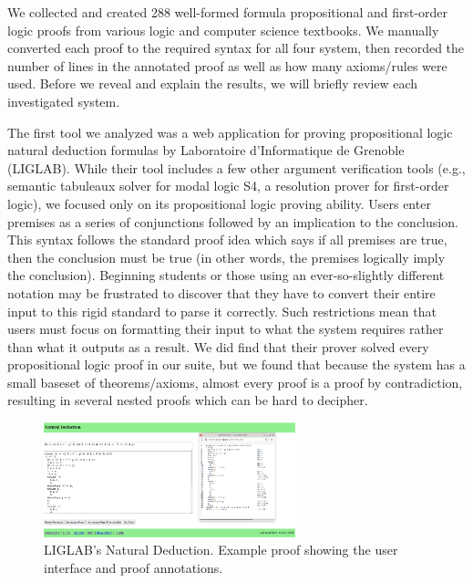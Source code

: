 \documentclass[ms]{uncgdissertationexp2}
\theoremstyle{plain}
\theoremstyle{definition}
\theoremstyle{remark}
\newcommand{\titlecaption}[2]{\caption[#1]{#1. #2}}
\begin{document}
We collected and created 288 well-formed formula propositional and first-order logic proofs from various logic and computer science textbooks. We manually converted each proof to the required syntax for all four system, then recorded the number of lines in the annotated proof as well as how many axioms/rules were used. Before we reveal and explain the results, we will briefly review each investigated system.

The first tool we analyzed was a web application for proving propositional logic natural deduction formulas by Laboratoire d'Informatique de Grenoble (LIGLAB). While their tool includes a few other argument verification tools (e.g., semantic tabuleaux solver for modal logic S4, a resolution prover for first-order logic), we focused only on its propositional logic proving ability. Users enter premises as a series of conjunctions followed by an implication to the conclusion. This syntax follows the standard proof idea which says if all premises are true, then the conclusion must be true (in other words, the premises logically imply the conclusion). Beginning students or those using an ever-so-slightly different notation may be frustrated to discover that they have to convert their entire input to this rigid standard to parse it correctly. Such restrictions mean that users must focus on formatting their input to what the system requires rather than what it outputs as a result. We did find that their prover solved every propositional logic proof in our suite, but we found that because the system has a small baseset of theorems/axioms, almost every proof is a proof by contradiction, resulting in several nested proofs which can be hard to decipher.
\begin{figure}[!ht]
	\centering
	\includegraphics[width=0.65\textwidth]{teachinglogic.png}
	\titlecaption{LIGLAB's Natural Deduction}{Example proof showing the user interface and proof annotations.}
	\label{fig:liglab}
\end{figure} 
\end{document}
